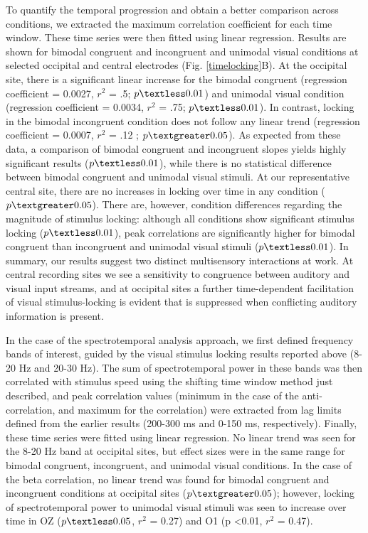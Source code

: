 To quantify the temporal progression and obtain a better comparison across
conditions, we extracted the maximum correlation coefficient for each time
window. These time series were then fitted using linear regression. Results
are shown for bimodal congruent and incongruent and unimodal visual
conditions at selected occipital and central electrodes (Fig. \ref{timelocking}B). At the
occipital site, there is a significant linear increase for the bimodal
congruent (regression coefficient = 0.0027, $r^2$ = .5; $p \textless 0.01$)
and unimodal visual condition (regression coefficient = 0.0034, $r^2$ =
.75; $p \textless 0.01$). In contrast, locking in the bimodal incongruent
condition does not follow any linear trend (regression coefficient =
0.0007, $r^2$ = .12 ; $p \textgreater 0.05$). As expected from these data,
a comparison of bimodal congruent and incongruent slopes yields highly
significant results ($p \textless 0.01$), while there is no statistical
difference between bimodal congruent and unimodal visual stimuli. At our
representative central site, there are no increases in locking over time in
any condition ($p \textgreater 0.05$). There are, however, condition
differences regarding the magnitude of stimulus locking: although all
conditions show significant stimulus locking ($p \textless 0.01$), peak
correlations are significantly higher for bimodal congruent than
incongruent and unimodal visual stimuli ($p \textless 0.01$). In summary,
our results suggest two distinct multisensory interactions at work. At
central recording sites we see a sensitivity to congruence between auditory
and visual input streams, and at occipital sites a further time-dependent
facilitation of visual stimulus-locking is evident that is suppressed when
conflicting auditory information is present.



In the case of the spectrotemporal analysis approach, we first defined
frequency bands of interest, guided by the visual stimulus locking results
reported above (8-20 Hz and 20-30 Hz). The sum of spectrotemporal power in
these bands was then correlated with stimulus speed using the shifting time
window method just described, and peak correlation values (minimum in the
case of the anti-correlation, and maximum for the correlation) were
extracted from lag limits defined from the earlier results (200-300 ms and
0-150 ms, respectively). Finally, these time series were fitted using
linear regression. No linear trend was seen for the 8-20 Hz band at
occipital sites, but effect sizes were in the same range for bimodal
congruent, incongruent, and unimodal visual conditions. In the case of the
beta correlation, no linear trend was found for bimodal congruent and
incongruent conditions at occipital sites ($p \textgreater 0.05$); however,
locking of spectrotemporal power to unimodal visual stimuli was seen to
increase over time in OZ ($p \textless 0.05$, $r^2$ = 0.27) and O1 (p
\textless 0.01, $r^2$ = 0.47).


